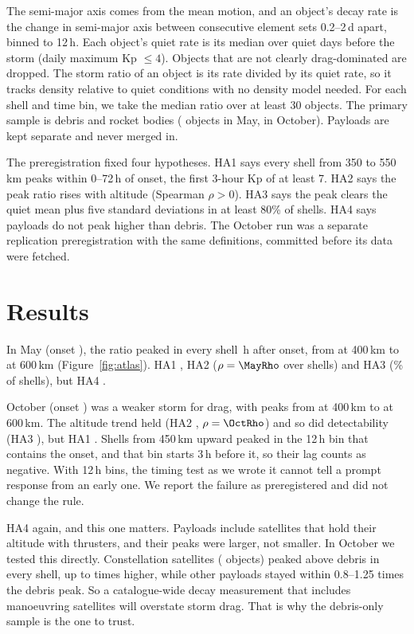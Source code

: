 \documentclass[linenumbers]{aastex701}
\begin{document}
The semi-major axis comes from the mean motion, and an object's decay rate is the change in semi-major axis between consecutive element sets 0.2--2\,d apart, binned to 12\,h. Each object's quiet rate is its median over \MayNQuiet{} quiet days before the storm (daily maximum Kp $\leq 4$). Objects that are not clearly drag-dominated are dropped. The storm ratio of an object is its rate divided by its quiet rate, so it tracks density relative to quiet conditions with no density model needed. For each shell and time bin, we take the median ratio over at least 30 objects. The primary sample is debris and rocket bodies (\MayNPrimary{} objects in May, \OctNPrimary{} in October). Payloads are kept separate and never merged in.

The preregistration fixed four hypotheses. HA1 says every shell from 350 to 550\,km peaks within 0--72\,h of onset, the first 3-hour Kp of at least 7. HA2 says the peak ratio rises with altitude (Spearman $\rho > 0$). HA3 says the peak clears the quiet mean plus five standard deviations in at least 80\% of shells. HA4 says payloads do not peak higher than debris. The October run was a separate replication preregistration with the same definitions, committed before its data were fetched.

\section{Results}
In May (onset \MayOnset), the ratio peaked in every shell \MayLagFour\,h after onset, from \MayPeakFour{} at 400\,km to \MayPeakSix{} at 600\,km (Figure~\ref{fig:atlas}). HA1 \MayHAOne, HA2 \MayHATwo{} ($\rho = \MayRho$ over \MayNShells{} shells) and HA3 \MayHAThree{} (\MayDetectFrac\% of \MayDetectN{} shells), but HA4 \MayHAFour.

October (onset \OctOnset) was a weaker storm for drag, with peaks from \OctPeakFour{} at 400\,km to \OctPeakSix{} at 600\,km. The altitude trend held (HA2 \OctHATwo, $\rho = \OctRho$) and so did detectability (HA3 \OctHAThree), but HA1 \OctHAOne. Shells from 450\,km upward peaked in the 12\,h bin that contains the onset, and that bin starts 3\,h before it, so their lag counts as negative. With 12\,h bins, the timing test as we wrote it cannot tell a prompt response from an early one. We report the failure as preregistered and did not change the rule.

HA4 \OctHAFour{} again, and this one matters. Payloads include satellites that hold their altitude with thrusters, and their peaks were larger, not smaller. In October we tested this directly. Constellation satellites (\OctNConst{} objects) peaked above debris in every shell, up to \OctConstMaxRatio{} times higher, while other payloads stayed within 0.8--1.25 times the debris peak. So a catalogue-wide decay measurement that includes manoeuvring satellites will overstate storm drag. That is why the debris-only sample is the one to trust.
\end{document}
